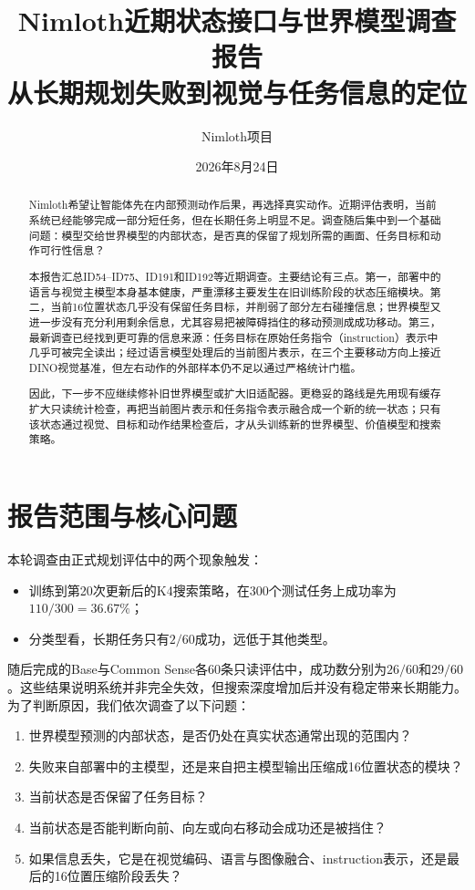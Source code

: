 \documentclass[UTF8,11pt,a4paper,fontset=none]{ctexart}
\title{\textbf{Nimloth近期状态接口与世界模型调查报告}\\[0.5em]
\large 从长期规划失败到视觉与任务信息的定位}
\author{Nimloth项目}
\date{2026年8月24日}
\begin{document}
\maketitle

\begin{abstract}
Nimloth希望让智能体先在内部预测动作后果，再选择真实动作。近期评估表明，当前系统已经能够完成一部分短任务，但在长期任务上明显不足。调查随后集中到一个基础问题：模型交给世界模型的内部状态，是否真的保留了规划所需的画面、任务目标和动作可行性信息？

本报告汇总ID54--ID75、ID191和ID192等近期调查。主要结论有三点。第一，部署中的语言与视觉主模型本身基本健康，严重漂移主要发生在旧训练阶段的状态压缩模块。第二，当前16位置状态几乎没有保留任务目标，并削弱了部分左右碰撞信息；世界模型又进一步没有充分利用剩余信息，尤其容易把被障碍挡住的移动预测成成功移动。第三，最新调查已经找到更可靠的信息来源：任务目标在原始任务指令（instruction）表示中几乎可被完全读出；经过语言模型处理后的当前图片表示，在三个主要移动方向上接近DINO视觉基准，但左右动作的外部样本仍不足以通过严格统计门槛。

因此，下一步不应继续修补旧世界模型或扩大旧适配器。更稳妥的路线是先用现有缓存扩大只读统计检查，再把当前图片表示和任务指令表示融合成一个新的统一状态；只有该状态通过视觉、目标和动作结果检查后，才从头训练新的世界模型、价值模型和搜索策略。
\end{abstract}

\tableofcontents
\newpage

\section{报告范围与核心问题}

本轮调查由正式规划评估中的两个现象触发：

\begin{itemize}
  \item 训练到第20次更新后的K4搜索策略，在300个测试任务上成功率为$110/300=36.67\%$；
  \item 分类型看，长期任务只有$2/60$成功，远低于其他类型。
\end{itemize}

随后完成的Base与Common Sense各60条只读评估中，成功数分别为$26/60$和$29/60$。这些结果说明系统并非完全失效，但搜索深度增加后并没有稳定带来长期能力。为了判断原因，我们依次调查了以下问题：

\begin{enumerate}
  \item 世界模型预测的内部状态，是否仍处在真实状态通常出现的范围内？
  \item 失败来自部署中的主模型，还是来自把主模型输出压缩成16位置状态的模块？
  \item 当前状态是否保留了任务目标？
  \item 当前状态是否能判断向前、向左或向右移动会成功还是被挡住？
  \item 如果信息丢失，它是在视觉编码、语言与图像融合、instruction表示，还是最后的16位置压缩阶段丢失？
\end{enumerate}
\end{document}
